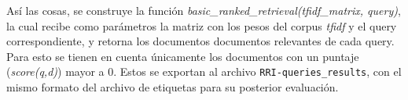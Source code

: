 Así las cosas, se construye la función \textit{basic\_ranked\_retrieval(tfidf_matrix, query)}, la cual recibe como parámetros la matriz con los pesos del corpus \textit{tfidf} y el query correspondiente, y retorna los documentos documentos relevantes de cada query. Para esto se tienen en cuenta únicamente los documentos con un puntaje (\textit{score(q,d)}) mayor a 0. Estos se exportan al archivo \texttt{RRI-queries\_results}, con el mismo formato del archivo de etiquetas para su posterior evaluación.